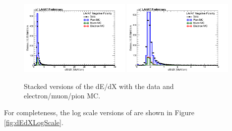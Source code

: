 \begin{figure}[htb]
\centering
\includegraphics[width=0.48\textwidth]{Studies/Figures/dEdX_stacked_v1.png}
\includegraphics[width=0.48\textwidth]{Studies/Figures/dEdX_stacked_v4.png}
\caption[]{ Stacked versions of the dE/dX with the data and electron/muon/pion MC.  } \label{fig:dEdXLinearStacked}
\end{figure}

For completeness, the log scale versions of are shown in Figure \ref{fig:dEdXLogScale}.

